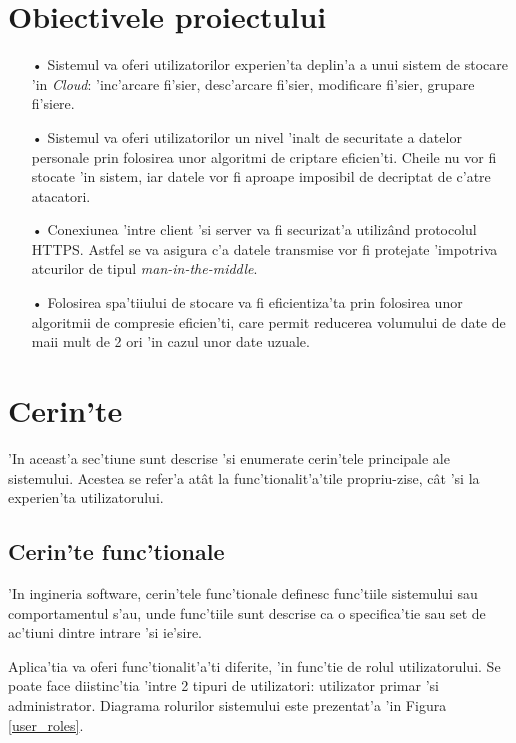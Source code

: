 \documentclass[12pt,a4paper,twoside]{report}
\begin{document}
\section{Obiectivele proiectului}
\begin{itemize}

\item[•]{Sistemul va oferi utilizatorilor experien'ta deplin'a a unui sistem de stocare 'in \textit{Cloud}: 'inc'arcare fi'sier, desc'arcare fi'sier, modificare fi'sier, grupare fi'siere.}

\item[•]{Sistemul va oferi utilizatorilor un nivel 'inalt de securitate a datelor personale prin folosirea unor algoritmi de criptare eficien'ti. Cheile nu vor fi stocate 'in sistem, iar datele vor fi aproape imposibil de decriptat de c'atre atacatori.}

\item[•]{Conexiunea 'intre client 'si server va fi securizat'a utilizând protocolul HTTPS. Astfel se va asigura c'a datele transmise vor fi protejate 'impotriva atcurilor de tipul \textit{man-in-the-middle}.}

\item[•]{Folosirea spa'tiiului de stocare va fi eficientiza'ta prin folosirea unor algoritmii de compresie eficien'ti, care permit reducerea volumului de date de maii mult de 2 ori 'in cazul unor date uzuale.}
\end{itemize}

\section{Cerin'te}
'In aceast'a sec'tiune sunt descrise 'si enumerate cerin'tele principale ale sistemului. Acestea se refer'a atât la func'tionalit'a'tile propriu-zise, cât 'si la experien'ta utilizatorului.
\subsection{Cerin'te func'tionale}
'In ingineria software, cerin'tele func'tionale definesc func'tiile sistemului sau comportamentul s'au, unde func'tiile sunt descrise ca o specifica'tie sau set de ac'tiuni dintre intrare 'si ie'sire. 

Aplica'tia va oferi func'tionalit'a'ti diferite, 'in func'tie de rolul utilizatorului. Se poate face diistinc'tia 'intre 2 tipuri de utilizatori: utilizator primar 'si administrator. Diagrama rolurilor sistemului este prezentat'a 'in Figura \ref{user_roles}.
\end{document}
